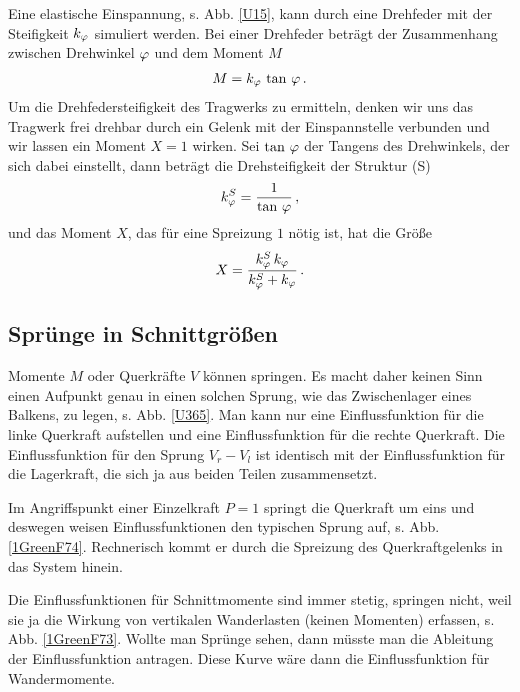 Eine elastische Einspannung, s. Abb. \ref{U15}, kann durch eine Drehfeder mit der Steifigkeit $k_\varphi$ simuliert werden. Bei einer Drehfeder betr\"{a}gt der Zusammenhang zwischen Drehwinkel $\varphi$ und dem Moment $M$
\begin{align}
M = k_{\varphi}\,\tan\,\varphi\,.
\end{align}
Um die Drehfedersteifigkeit des Tragwerks zu ermitteln, denken wir uns das Tragwerk frei drehbar durch ein Gelenk mit der Einspannstelle verbunden und wir lassen ein Moment $X = 1 $ wirken. Sei $\tan\,\varphi$ der Tangens des Drehwinkels, der sich dabei einstellt, dann betr\"{a}gt die Drehsteifigkeit der Struktur (S)
\begin{align}
k_{\varphi}^S = \frac{1}{\tan\,\varphi}\,,
\end{align}
und das Moment $X$, das f\"{u}r eine Spreizung $1$ n\"{o}tig ist, hat die Gr\"{o}{\ss}e
\begin{align}
X = \frac{k_\varphi^S\,k_\varphi}{k_\varphi^S + k_\varphi} \,.
\end{align}

{\textcolor{sectionTitleBlue}{\section{Spr\"{u}nge in Schnittgr\"{o}{\ss}en}}}
Momente $M$ oder Querkr\"{a}fte $V$ k\"{o}nnen springen. Es macht daher keinen Sinn einen Aufpunkt genau in einen solchen Sprung, wie das Zwischenlager eines Balkens, zu legen, s. Abb. \ref{U365}. Man kann nur eine Einflussfunktion f\"{u}r die linke Querkraft aufstellen und eine Einflussfunktion f\"{u}r die rechte Querkraft. Die Einflussfunktion f\"{u}r den Sprung $V_r - V_l$ ist identisch mit der Einflussfunktion f\"{u}r die Lagerkraft, die sich ja aus beiden Teilen zusammensetzt.

Im Angriffspunkt einer Einzelkraft $P = 1$ springt die Querkraft um eins und deswegen weisen Einflussfunktionen den typischen Sprung auf, s. Abb. \ref{1GreenF74}. Rechnerisch kommt er durch die Spreizung des Querkraftgelenks in das System hinein.

Die Einflussfunktionen f\"{u}r Schnittmomente sind immer stetig, springen nicht, weil sie ja die Wirkung von vertikalen Wanderlasten (keinen Momenten) erfassen, s. Abb. \ref{1GreenF73}. Wollte man Spr\"{u}nge sehen, dann m\"{u}sste man die Ableitung der Einflussfunktion antragen. Diese Kurve w\"{a}re dann die Einflussfunktion f\"{u}r Wandermomente.

